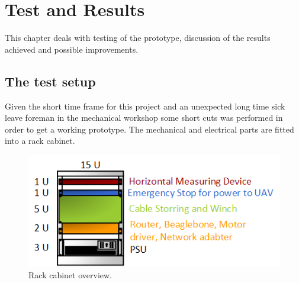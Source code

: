 
\chapter{Test and Results}
This chapter deals with testing of the prototype, discussion of the results achieved and possible improvements.  

\section{The test setup}
Given the short time frame for this project and an unexpected long time sick leave foreman in the mechanical workshop some short cuts was performed in order to get a working prototype. The mechanical and electrical parts are fitted into a rack cabinet.

\begin{figure}[hbtp]
  \centering
  \includegraphics[scale=1]{graphics/Visio/rack-setup.png}
  \caption{Rack cabinet overview.}
  \end{figure}   

